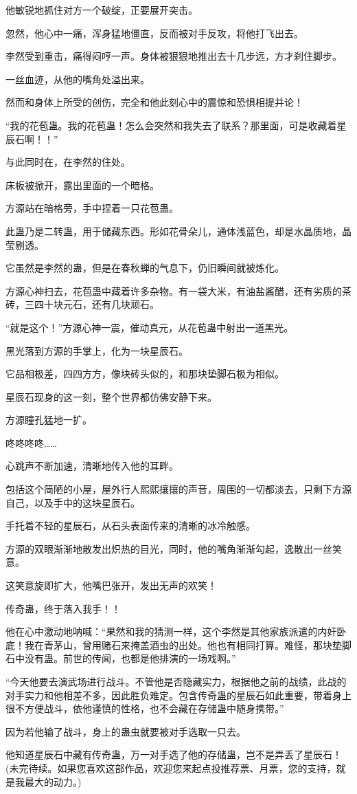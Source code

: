 \begin{this_body}
他敏锐地抓住对方一个破绽，正要展开突击。

忽然，他心中一痛，浑身猛地僵直，反而被对手反攻，将他打飞出去。

李然受到重击，痛得闷哼一声。身体被狠狠地推出去十几步远，方才刹住脚步。

一丝血迹，从他的嘴角处溢出来。

然而和身体上所受的创伤，完全和他此刻心中的震惊和恐惧相提并论！

“我的花苞蛊。我的花苞蛊！怎么会突然和我失去了联系？那里面，可是收藏着星辰石啊！！”

与此同时在，在李然的住处。

床板被掀开，露出里面的一个暗格。

方源站在暗格旁，手中捏着一只花苞蛊。

此蛊乃是二转蛊，用于储藏东西。形如花骨朵儿，通体浅蓝色，却是水晶质地，晶莹剔透。

它虽然是李然的蛊，但是在春秋蝉的气息下，仍旧瞬间就被炼化。

方源心神扫去，花苞蛊中藏着许多杂物。有一袋大米，有油盐酱醋，还有劣质的茶砖，三四十块元石，还有几块顽石。

“就是这个！”方源心神一震，催动真元，从花苞蛊中射出一道黑光。

黑光落到方源的手掌上，化为一块星辰石。

它品相极差，四四方方，像块砖头似的，和那块垫脚石极为相似。

星辰石现身的这一刻，整个世界都仿佛安静下来。

方源瞳孔猛地一扩。

咚咚咚咚……

心跳声不断加速，清晰地传入他的耳畔。

包括这个简陋的小屋，屋外行人熙熙攘攘的声音，周围的一切都淡去，只剩下方源自己，以及手中的这块星辰石。

手托着不轻的星辰石，从石头表面传来的清晰的冰冷触感。

方源的双眼渐渐地散发出炽热的目光，同时，他的嘴角渐渐勾起，逸散出一丝笑意。

这笑意旋即扩大，他嘴巴张开，发出无声的欢笑！

传奇蛊，终于落入我手！！

他在心中激动地呐喊：“果然和我的猜测一样，这个李然是其他家族派遣的内奸卧底！我在青茅山，曾用赌石来掩盖酒虫的出处。他也有相同打算。难怪，那块垫脚石中没有蛊。前世的传闻，也都是他排演的一场戏啊。”

“今天他要去演武场进行战斗。不管他是否隐藏实力，根据他之前的战绩，此战的对手实力和他相差不多，因此胜负难定。包含传奇蛊的星辰石如此重要，带着身上很不方便战斗，依他谨慎的性格，也不会藏在存储蛊中随身携带。”

因为若他输了战斗，身上的蛊虫就要被对手选取一只去。

他知道星辰石中藏有传奇蛊，万一对手选了他的存储蛊，岂不是弄丢了星辰石！(未完待续。如果您喜欢这部作品，欢迎您来起点投推荐票、月票，您的支持，就是我最大的动力。)

\end{this_body}

